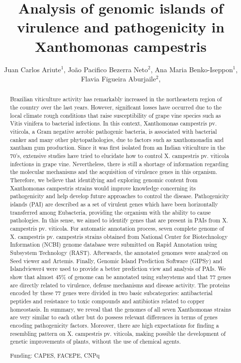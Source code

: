 \documentclass[twoside]{article}
\title{\vspace{-15mm}\fontsize{24pt}{10pt}\selectfont\textbf{ Analysis of genomic islands of virulence and pathogenicity in Xanthomonas campestris }} %
\author{ Juan Carlos Ariute$^{1}$, João Pacifico Bezerra Neto$^{2}$, Ana Maria Benko-Iseppon$^{1}$, Flavia Figueira Aburjaile$^{2}$, }
\affil{ 1 Federal University of Pernambuco Center of Biological Sciences Genetics Dept.

2 Federal University of Pernambuco Center of Biological Sciences  Genetics Dept.

 }
\date{}
\begin{document}
  
  
  \maketitle %
  
  
  \thispagestyle{fancy} %
  
  
  \begin{abstract}
  Brazilian viticulture activity has remarkably increased in the northeastern region of the
country over the last years. However, significant losses have occurred due to the local
climate rough conditions that raise susceptibility of grape vine species such as Vitis
vinifera to bacterial infections. In this context, Xanthomonas campestris pv. viticola, a
Gram negative aerobic pathogenic bacteria, is associated with bacterial canker and
many other phytopathologies, due to factors such as xanthomonadin and xantham gum
production. Since it was first isolated from an Indian viticulture in the 70’s, extensive
studies have tried to elucidate how to control X. campestris pv. viticola infections in
grape vine. Nevertheless, there is still a shortage of information regarding the molecular
mechanisms and the acquisition of virulence genes in this organism. Therefore, we
believe that identifying and exploring genomic content from Xanthomonas campestris
strains would improve knowledge concerning its pathogenicity and help develop future
approaches to control the disease. Pathogenicity islands (PAI) are described as a set of
virulent genes which have been horizontally transferred among Eubacteria, providing
the organism with the ability to cause pathologies. In this sense, we aimed to identify
genes that are present in PAIs from X. campestris pv. viticola. For automatic annotation
process, seven complete genome of X. campestris pv. campestris strains obtained from
National Center for Biotechnology Information (NCBI) genome database were submitted
on Rapid Annotation using Subsystem Technology (RAST). Afterwards, the annotated
genomes were analyzed on Seed viewer and Artemis. Finally, Genomic Island
Prediction Software (GIPSy) and Islandviewer4 were used to provide a better prediction
view and analysis of PAIs. We show that almost 45\% of genome can be annotated
using subsystems and that 77 genes are directly related to virulence, defense
mechanisms and disease activity. The proteins encoded by these 77 genes were
divided in two basic subcategories: antibacterial peptides and resistance to toxic
compounds and antibiotics related to copper homeostasis. In summary, we reveal that
the genomes of all seven Xanthomonas strains are very similar to each other but do
possess relevant differences in terms of genes encoding pathogenicity factors.
Moreover, there are high expectations for finding a resembling pattern on X. campestris
pv. viticola, making possible the development of genetic improvements of plants,
without the use of chemical agents.
  
  Funding: CAPES, FACEPE, CNPq \\ 
  \end{abstract}
  
\end{document}

